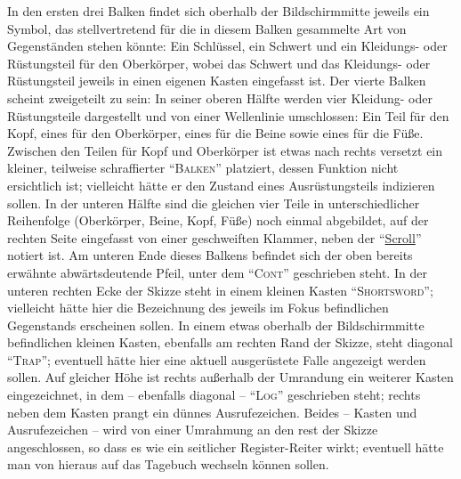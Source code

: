 \documentclass[a5paper,pagesize]{scrbook}
\begin{document}
In den ersten drei Balken findet sich oberhalb der Bildschirmmitte jeweils ein Symbol, das stellvertretend für die in diesem Balken gesammelte Art von Gegenständen stehen könnte:
Ein Schlüssel, ein Schwert und ein Kleidungs- oder Rüstungsteil für den Oberkörper, wobei das Schwert und das Kleidungs- oder Rüstungsteil jeweils in einen eigenen Kasten eingefasst ist.
Der vierte Balken scheint zweigeteilt zu sein:
In seiner oberen Hälfte werden vier Kleidung- oder Rüstungsteile dargestellt und von einer Wellenlinie umschlossen:
Ein Teil für den Kopf, eines für den Oberkörper, eines für die Beine sowie eines für die Füße.
Zwischen den Teilen für Kopf und Oberkörper ist etwas nach rechts versetzt ein kleiner, teilweise schraffierter \enquote{\textsc{Balken}} platziert, dessen Funktion nicht ersichtlich ist; vielleicht hätte er den Zustand eines Ausrüstungsteils indizieren sollen. %
In der unteren Hälfte sind die gleichen vier Teile in unterschiedlicher Reihenfolge (Oberkörper, Beine, Kopf, Füße) noch einmal abgebildet, auf der rechten Seite eingefasst von einer geschweiften Klammer, neben der \enquote{\uline{Scroll}} notiert ist.
Am unteren Ende dieses Balkens befindet sich der oben bereits erwähnte abwärtsdeutende Pfeil, unter dem \enquote{\textsc{Cont}} geschrieben steht.
In der unteren rechten Ecke der Skizze steht in einem kleinen Kasten \enquote{\textsc{Shortsword}}; vielleicht hätte hier die Bezeichnung des jeweils im Fokus befindlichen Gegenstands erscheinen sollen. %
In einem etwas oberhalb der Bildschirmmitte befindlichen kleinen Kasten, ebenfalls am rechten Rand der Skizze, steht diagonal \enquote{\textsc{Trap}}; eventuell hätte hier eine aktuell ausgerüstete Falle angezeigt werden sollen. %
Auf gleicher Höhe ist rechts außerhalb der Umrandung ein weiterer Kasten eingezeichnet, in dem -- ebenfalls diagonal -- \enquote{\textsc{Log}} geschrieben steht; rechts neben dem Kasten prangt ein dünnes Ausrufezeichen.
Beides -- Kasten und Ausrufezeichen -- wird von einer Umrahmung an den rest der Skizze angeschlossen, so dass es wie ein seitlicher Register-Reiter wirkt; eventuell hätte man von hieraus auf das Tagebuch wechseln können sollen.
\end{document}
